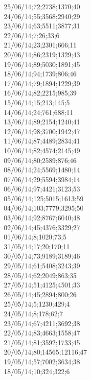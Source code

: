 25/06/14;72;2738;1370;40 \\
24/06/14;55;3568;2940;29 \\
23/06/14;63;5511;3877;31 \\
22/06/14;7;26;33;6 \\
21/06/14;23;2301;666;11 \\
20/06/14;86;2319;1329;43 \\
19/06/14;89;5030;1891;45 \\
18/06/14;94;1739;806;46 \\
17/06/14;79;1894;1229;39 \\
16/06/14;82;2215;985;39 \\
15/06/14;15;213;145;5 \\
14/06/14;24;761;688;11 \\
13/06/14;89;2154;1240;41 \\
12/06/14;98;3700;1942;47 \\
11/06/14;87;4489;2834;41 \\
10/06/14;82;4574;2145;49 \\
09/06/14;80;2589;876;46 \\
08/06/14;24;5569;1480;14 \\
07/06/14;29;5594;3984;14 \\
06/06/14;97;4421;3123;53 \\
05/06/14;125;5015;1613;59 \\
04/06/14;103;7779;3295;50 \\
03/06/14;92;8767;6040;48 \\
02/06/14;45;4376;3329;27 \\
01/06/14;8;1020;73;5 \\
31/05/14;17;20;170;11 \\
30/05/14;73;9189;3189;46 \\
29/05/14;61;5408;3243;39 \\
28/05/14;62;2049;863;35 \\
27/05/14;51;4125;4501;33 \\
26/05/14;45;2894;800;26 \\
25/05/14;5;1230;429;4 \\
24/05/14;8;178;62;7 \\
23/05/14;67;4211;3692;38 \\
22/05/14;83;4663;1558;47 \\
21/05/14;81;3592;1733;45 \\
20/05/14;80;14565;12116;47 \\
19/05/14;57;7002;3634;38 \\
18/05/14;10;324;322;6 \\
